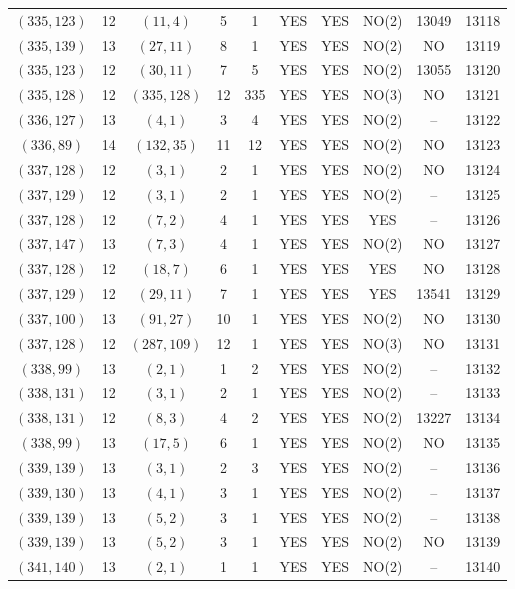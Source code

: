 \begin{longtable}{|c|c|c|c|c|c|c|c|c|c|}
$(335, 123)$ & 12 & $(11, 4)$ & 5 & 1 & YES & YES & NO(2) & 13049 & 13118\\
$(335, 139)$ & 13 & $(27, 11)$ & 8 & 1 & YES & YES & NO(2) & NO & 13119\\
$(335, 123)$ & 12 & $(30, 11)$ & 7 & 5 & YES & YES & NO(2) & 13055 & 13120\\
$(335, 128)$ & 12 & $(335, 128)$ & 12 & 335 & YES & YES & NO(3) & NO & 13121\\
$(336, 127)$ & 13 & $(4, 1)$ & 3 & 4 & YES & YES & NO(2) & -- & 13122\\
$(336, 89)$ & 14 & $(132, 35)$ & 11 & 12 & YES & YES & NO(2) & NO & 13123\\
$(337, 128)$ & 12 & $(3, 1)$ & 2 & 1 & YES & YES & NO(2) & NO & 13124\\
$(337, 129)$ & 12 & $(3, 1)$ & 2 & 1 & YES & YES & NO(2) & -- & 13125\\
$(337, 128)$ & 12 & $(7, 2)$ & 4 & 1 & YES & YES & YES & -- & 13126\\
$(337, 147)$ & 13 & $(7, 3)$ & 4 & 1 & YES & YES & NO(2) & NO & 13127\\
$(337, 128)$ & 12 & $(18, 7)$ & 6 & 1 & YES & YES & YES & NO & 13128\\
$(337, 129)$ & 12 & $(29, 11)$ & 7 & 1 & YES & YES & YES & 13541 & 13129\\
$(337, 100)$ & 13 & $(91, 27)$ & 10 & 1 & YES & YES & NO(2) & NO & 13130\\
$(337, 128)$ & 12 & $(287, 109)$ & 12 & 1 & YES & YES & NO(3) & NO & 13131\\
$(338, 99)$ & 13 & $(2, 1)$ & 1 & 2 & YES & YES & NO(2) & -- & 13132\\
$(338, 131)$ & 12 & $(3, 1)$ & 2 & 1 & YES & YES & NO(2) & -- & 13133\\
$(338, 131)$ & 12 & $(8, 3)$ & 4 & 2 & YES & YES & NO(2) & 13227 & 13134\\
$(338, 99)$ & 13 & $(17, 5)$ & 6 & 1 & YES & YES & NO(2) & NO & 13135\\
$(339, 139)$ & 13 & $(3, 1)$ & 2 & 3 & YES & YES & NO(2) & -- & 13136\\
$(339, 130)$ & 13 & $(4, 1)$ & 3 & 1 & YES & YES & NO(2) & -- & 13137\\
$(339, 139)$ & 13 & $(5, 2)$ & 3 & 1 & YES & YES & NO(2) & -- & 13138\\
$(339, 139)$ & 13 & $(5, 2)$ & 3 & 1 & YES & YES & NO(2) & NO & 13139\\
$(341, 140)$ & 13 & $(2, 1)$ & 1 & 1 & YES & YES & NO(2) & -- & 13140\\

\end{longtable}

